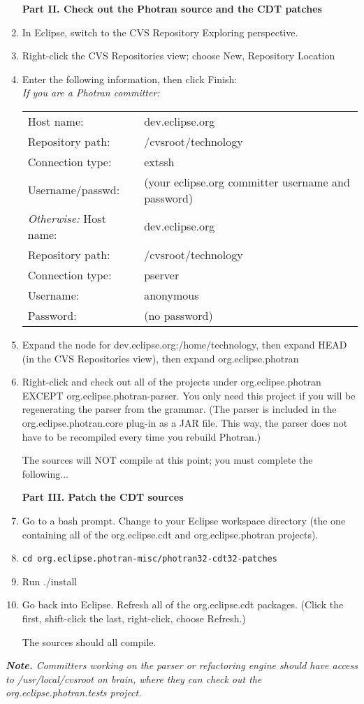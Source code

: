 \begin{enumerate}
\vspace{.5em}
\noindent\textbf{Part II.  Check out the Photran source and the CDT patches}

\item In Eclipse, switch to the CVS Repository Exploring perspective.
\item Right-click the CVS Repositories view; choose New, Repository Location
\item Enter the following information, then click Finish: \\
\textit{If you are a Photran committer:}
\begin{tabular}{ll}
        Host name:       & dev.eclipse.org \\
        Repository path: & /cvsroot/technology \\
        Connection type: & extssh \\
        Username/passwd: & (your eclipse.org committer username and password) \\
\textit{Otherwise:}
        Host name:       & dev.eclipse.org \\
        Repository path: & /cvsroot/technology \\
        Connection type: & pserver \\
        Username:        & anonymous \\
        Password:        & (no password) \\
\end{tabular}
\item Expand the node for dev.eclipse.org:/home/technology,
    then expand HEAD (in the CVS Repositories view), then expand
    org.eclipse.photran
\item{Right-click and check out all of the projects under org.eclipse.photran
    EXCEPT org.eclipse.photran-parser.
    You only need this project if you will be regenerating the parser from the
    grammar.  (The parser is included in the org.eclipse.photran.core plug-in
    as a JAR file.  This way, the parser does not have to be recompiled
    every time you rebuild Photran.)}

The sources will NOT compile at this point; you must complete the following...

\vspace{.5em}
\noindent\textbf{Part III.  Patch the CDT sources}

\item Go to a bash prompt.  Change to your Eclipse workspace directory
    (the one containing all of the org.eclipse.cdt and
    org.eclipse.photran projects).
\item \texttt{cd org.eclipse.photran-misc/photran32-cdt32-patches}
\item Run ./install
\item{Go back into Eclipse.  Refresh all of the org.eclipse.cdt packages.
    (Click the first, shift-click the last, right-click, choose Refresh.)}

The sources should all compile.

\end{enumerate}

\noindent\textit{\textbf{Note.} Committers working on the parser or refactoring
engine should have access to /usr/local/cvsroot on brain, where they can
check out the org.eclipse.photran.tests project.}
